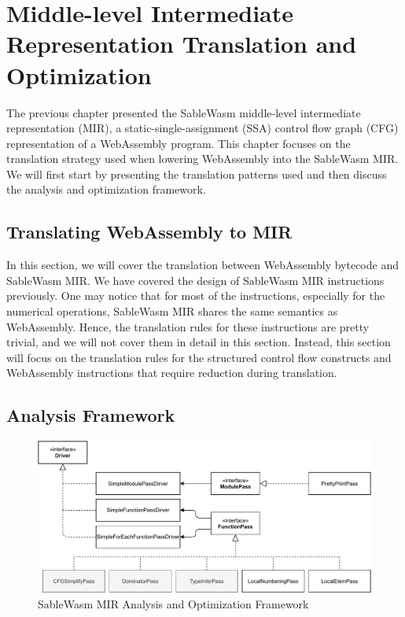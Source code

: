 \chapter{Middle-level Intermediate Representation Translation and Optimization}
\label{chapter:mir-translation-optimization}

The previous chapter presented the SableWasm middle-level intermediate
representation (MIR), a static-single-assignment (SSA) control flow graph (CFG)
representation of a WebAssembly program. This chapter focuses on the translation
strategy used when lowering WebAssembly into the SableWasm MIR. We will first
start by presenting the translation patterns used and then discuss the analysis
and optimization framework.

\section{Translating WebAssembly to MIR}
\label{section:mir-translation}

In this section, we will cover the translation between WebAssembly bytecode and
SableWasm MIR. We have covered the design of SableWasm MIR instructions
previously. One may notice that for most of the instructions, especially for the
numerical operations, SableWasm MIR shares the same semantics as WebAssembly.
Hence, the translation rules for these instructions are pretty trivial, and we
will not cover them in detail in this section. Instead, this section will focus
on the translation rules for the structured control flow constructs and
WebAssembly instructions that require reduction during translation.




\section{Analysis Framework}
\label{section:mir-opt}

\begin{figure}
    \centering
    \includegraphics[width=\textwidth]{Images/4.MIR/analysis-framework.pdf}
    \caption{SableWasm MIR Analysis and Optimization Framework}
    \label{fig:sablewasm-mir-analysis-framework}
\end{figure}

